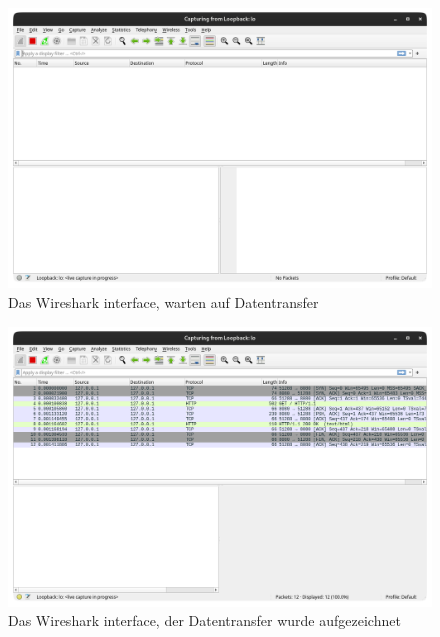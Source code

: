 \documentclass[12pt]{article}
\begin{document}
\begin{figure}[h]
	\centering
	\includegraphics[scale=0.3]{Bilder/Anlagen_2}
	\caption{Das Wireshark interface, warten auf Datentransfer \cite{screenshots-self}}
	\label{fig:figure31}
\end{figure}

\begin{figure}[h]
	\centering
	\includegraphics[scale=0.3]{Bilder/Anlagen_3}
	\caption{Das Wireshark interface, der Datentransfer wurde aufgezeichnet\cite{screenshots-self}}
	\label{fig:figure32}
\end{figure}
\end{document}
